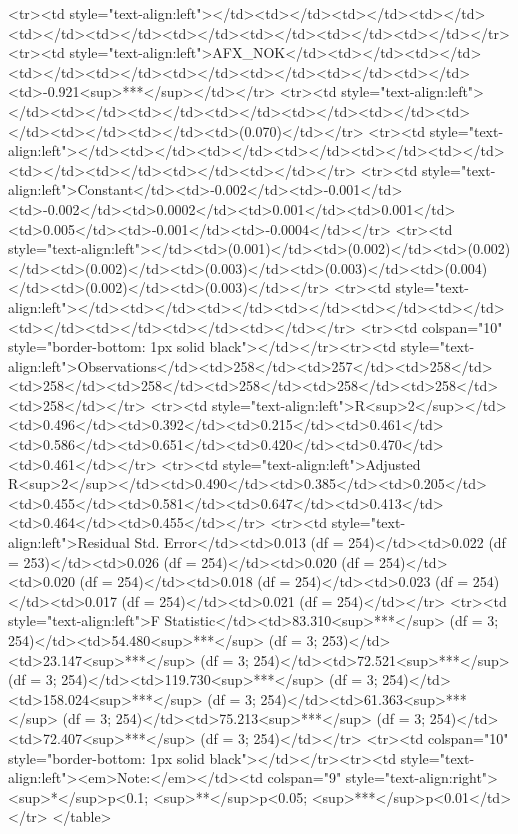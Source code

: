 <tr><td style="text-align:left"></td><td></td><td></td><td></td><td></td><td></td><td></td><td></td><td></td><td></td></tr>
<tr><td style="text-align:left">AFX_NOK</td><td></td><td></td><td></td><td></td><td></td><td></td><td></td><td></td><td>-0.921<sup>***</sup></td></tr>
<tr><td style="text-align:left"></td><td></td><td></td><td></td><td></td><td></td><td></td><td></td><td></td><td>(0.070)</td></tr>
<tr><td style="text-align:left"></td><td></td><td></td><td></td><td></td><td></td><td></td><td></td><td></td><td></td></tr>
<tr><td style="text-align:left">Constant</td><td>-0.002</td><td>-0.001</td><td>-0.002</td><td>0.0002</td><td>0.001</td><td>0.001</td><td>0.005</td><td>-0.001</td><td>-0.0004</td></tr>
<tr><td style="text-align:left"></td><td>(0.001)</td><td>(0.002)</td><td>(0.002)</td><td>(0.002)</td><td>(0.003)</td><td>(0.003)</td><td>(0.004)</td><td>(0.002)</td><td>(0.003)</td></tr>
<tr><td style="text-align:left"></td><td></td><td></td><td></td><td></td><td></td><td></td><td></td><td></td><td></td></tr>
<tr><td colspan="10" style="border-bottom: 1px solid black"></td></tr><tr><td style="text-align:left">Observations</td><td>258</td><td>257</td><td>258</td><td>258</td><td>258</td><td>258</td><td>258</td><td>258</td><td>258</td></tr>
<tr><td style="text-align:left">R<sup>2</sup></td><td>0.496</td><td>0.392</td><td>0.215</td><td>0.461</td><td>0.586</td><td>0.651</td><td>0.420</td><td>0.470</td><td>0.461</td></tr>
<tr><td style="text-align:left">Adjusted R<sup>2</sup></td><td>0.490</td><td>0.385</td><td>0.205</td><td>0.455</td><td>0.581</td><td>0.647</td><td>0.413</td><td>0.464</td><td>0.455</td></tr>
<tr><td style="text-align:left">Residual Std. Error</td><td>0.013 (df = 254)</td><td>0.022 (df = 253)</td><td>0.026 (df = 254)</td><td>0.020 (df = 254)</td><td>0.020 (df = 254)</td><td>0.018 (df = 254)</td><td>0.023 (df = 254)</td><td>0.017 (df = 254)</td><td>0.021 (df = 254)</td></tr>
<tr><td style="text-align:left">F Statistic</td><td>83.310<sup>***</sup> (df = 3; 254)</td><td>54.480<sup>***</sup> (df = 3; 253)</td><td>23.147<sup>***</sup> (df = 3; 254)</td><td>72.521<sup>***</sup> (df = 3; 254)</td><td>119.730<sup>***</sup> (df = 3; 254)</td><td>158.024<sup>***</sup> (df = 3; 254)</td><td>61.363<sup>***</sup> (df = 3; 254)</td><td>75.213<sup>***</sup> (df = 3; 254)</td><td>72.407<sup>***</sup> (df = 3; 254)</td></tr>
<tr><td colspan="10" style="border-bottom: 1px solid black"></td></tr><tr><td style="text-align:left"><em>Note:</em></td><td colspan="9" style="text-align:right"><sup>*</sup>p<0.1; <sup>**</sup>p<0.05; <sup>***</sup>p<0.01</td></tr>
</table>
